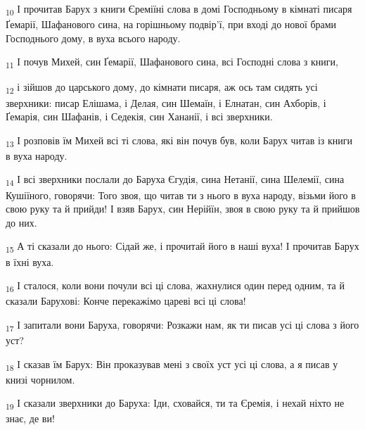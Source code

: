 \begin{tcolorbox}
\textsubscript{10} І прочитав Барух з книги Єреміїні слова в домі Господньому в кімнаті писаря Ґемарії, Шафанового сина, на горішньому подвір'ї, при вході до нової брами Господнього дому, в вуха всього народу.
\end{tcolorbox}
\begin{tcolorbox}
\textsubscript{11} І почув Михей, син Ґемарії, Шафанового сина, всі Господні слова з книги,
\end{tcolorbox}
\begin{tcolorbox}
\textsubscript{12} і зійшов до царського дому, до кімнати писаря, аж ось там сидять усі зверхники: писар Елішама, і Делая, син Шемаїн, і Елнатан, син Ахборів, і Ґемарія, син Шафанів, і Седекія, син Хананії, і всі зверхники.
\end{tcolorbox}
\begin{tcolorbox}
\textsubscript{13} І розповів їм Михей всі ті слова, які він почув був, коли Барух читав із книги в вуха народу.
\end{tcolorbox}
\begin{tcolorbox}
\textsubscript{14} І всі зверхники послали до Баруха Єгудія, сина Нетанії, сина Шелемії, сина Кушіїного, говорячи: Того звоя, що читав ти з нього в вуха народу, візьми його в свою руку та й прийди! І взяв Барух, син Нерійїн, звоя в свою руку та й прийшов до них.
\end{tcolorbox}
\begin{tcolorbox}
\textsubscript{15} А ті сказали до нього: Сідай же, і прочитай його в наші вуха! І прочитав Барух в їхні вуха.
\end{tcolorbox}
\begin{tcolorbox}
\textsubscript{16} І сталося, коли вони почули всі ці слова, жахнулися один перед одним, та й сказали Барухові: Конче перекажімо цареві всі ці слова!
\end{tcolorbox}
\begin{tcolorbox}
\textsubscript{17} І запитали вони Баруха, говорячи: Розкажи нам, як ти писав усі ці слова з його уст?
\end{tcolorbox}
\begin{tcolorbox}
\textsubscript{18} І сказав їм Барух: Він проказував мені з своїх уст усі ці слова, а я писав у книзі чорнилом.
\end{tcolorbox}
\begin{tcolorbox}
\textsubscript{19} І сказали зверхники до Баруха: Іди, сховайся, ти та Єремія, і нехай ніхто не знає, де ви!
\end{tcolorbox}
